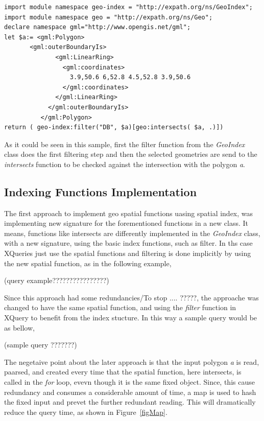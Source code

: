 \documentclass[a4paper,12pt]{article}
\begin{document}
\begin{verbatim}
import module namespace geo-index = "http://expath.org/ns/GeoIndex";
import module namespace geo = "http://expath.org/ns/Geo";
declare namespace gml="http://www.opengis.net/gml";
let $a:= <gml:Polygon>
	   <gml:outerBoundaryIs>
              <gml:LinearRing>
              	<gml:coordinates>
              	  3.9,50.6 6,52.8 4.5,52.8 3.9,50.6
              	</gml:coordinates>
              </gml:LinearRing>
            </gml:outerBoundaryIs>
          </gml:Polygon>
return ( geo-index:filter("DB", $a)[geo:intersects( $a, .)])
\end{verbatim}

As it could be seen in this sample, first the filter function from the \textit{GeoIndex} class does the first filtering step and then the selected geometries are send to the \textit{intersects} function to be checked against the intersection with the polygon \textit{a}.  

\subsection{Indexing Functions Implementation}
The first approach to implement geo spatial functions uasing spatial index, was implementing new signature for the forementioned functions in a new class. It means, functions like intersects are differently implemented in the \textit{GeoIndex} class, with a new signature, using the basic index functions, such as filter. In ths case XQueries just use the spatial functions and filtering is done implicitly by using the new spatial function, as in the following example,

(query example????????????????)

Since this approach had some redundancies/To stop ....  ?????, the approache was changed to have the same spatial function, and using the \textit{filter} function in XQuery to benefit from the index stucture. In this way a sample query would be as bellow,

 (sample query ???????)
 
The negetaive point about the later approach is that the input polygon \textit{a} is read, paarsed, and created every time that the spatial function, here intersects, is called in the \textit{for} loop, evevn though it is the same fixed object. Since, this cause redundancy and consumes a considerable amount of time, a map is used to hash the fixed input and prevet the further redundant reading. This will dramatically reduce the query time, as shown in Figure~\ref{figMap}.
\end{document}
